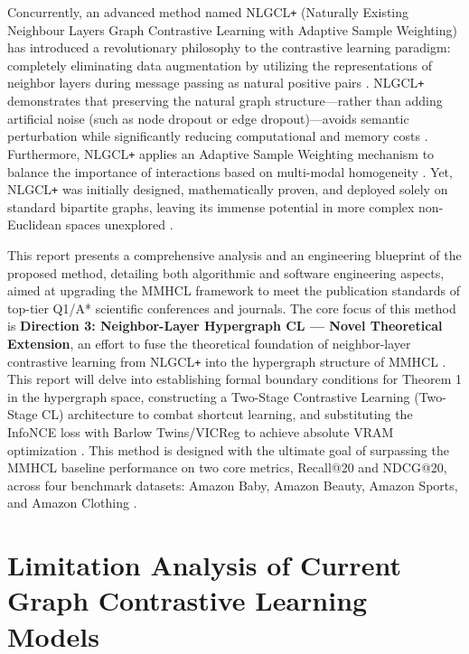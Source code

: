     Concurrently, an advanced method named NLGCL\texttt{+} (Naturally Existing Neighbour Layers Graph Contrastive Learning with Adaptive Sample Weighting) has introduced a revolutionary philosophy to the contrastive learning paradigm: completely eliminating data augmentation by utilizing the representations of neighbor layers during message passing as natural positive pairs \cite{feng2025nlgcl}. NLGCL\texttt{+} demonstrates that preserving the natural graph structure---rather than adding artificial noise (such as node dropout or edge dropout)---avoids semantic perturbation while significantly reducing computational and memory costs \cite{feng2025nlgcl, openreview2025hypergraphquantization}. Furthermore, NLGCL\texttt{+} applies an Adaptive Sample Weighting mechanism to balance the importance of interactions based on multi-modal homogeneity \cite{feng2025nlgcl}. Yet, NLGCL\texttt{+} was initially designed, mathematically proven, and deployed solely on standard bipartite graphs, leaving its immense potential in more complex non-Euclidean spaces unexplored \cite{he2023dynamicweightedhypergraph, zhang2020hypergraphsignalprocessing}.
    
    This report presents a comprehensive analysis and an engineering blueprint of the proposed method, detailing both algorithmic and software engineering aspects, aimed at upgrading the MMHCL framework to meet the publication standards of top-tier Q1/A* scientific conferences and journals. The core focus of this method is \textbf{Direction 3: Neighbor-Layer Hypergraph CL --- Novel Theoretical Extension}, an effort to fuse the theoretical foundation of neighbor-layer contrastive learning from NLGCL\texttt{+} into the hypergraph structure of MMHCL \cite{guo2025mmhcl, feng2025nlgcl}. This report will delve into establishing formal boundary conditions for Theorem 1 in the hypergraph space, constructing a Two-Stage Contrastive Learning (Two-Stage CL) architecture to combat shortcut learning, and substituting the InfoNCE loss with Barlow Twins/VICReg to achieve absolute VRAM optimization \cite{zbontar2021barlowtwins, bardes2022vicreg, grill2020byol}. This method is designed with the ultimate goal of surpassing the MMHCL baseline performance on two core metrics, Recall@20 and NDCG@20, across four benchmark datasets: Amazon Baby, Amazon Beauty, Amazon Sports, and Amazon Clothing \cite{ni2018amazonreviewdata, mcauley2023amazonlinks, amazonreviews2023fivecore}.
    
    \section{Limitation Analysis of Current Graph Contrastive Learning Models}
    
